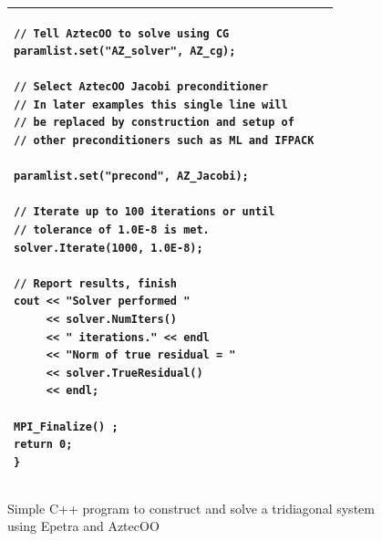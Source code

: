 \documentclass[acmtoms,acmnow]{acmtrans2m}
\begin{document}
\begin{figure}
{\begin{tabular}{|p{2.4in}|p{2.4in}|}
\begin{verbatim}
// Tell AztecOO to solve using CG
paramlist.set("AZ_solver", AZ_cg);
 
// Select AztecOO Jacobi preconditioner
// In later examples this single line will
// be replaced by construction and setup of
// other preconditioners such as ML and IFPACK

paramlist.set("precond", AZ_Jacobi);

// Iterate up to 100 iterations or until
// tolerance of 1.0E-8 is met.
solver.Iterate(1000, 1.0E-8);

// Report results, finish     
cout << "Solver performed " 
     << solver.NumIters()  
     << " iterations." << endl
     << "Norm of true residual = " 
     << solver.TrueResidual() 
     << endl;

MPI_Finalize() ;
return 0;
}
\end{verbatim}
\\\hline
\end{tabular}}
\caption{\label{fig:solvetrid} Simple C++ program to construct and
solve a tridiagonal system using Epetra and AztecOO}
\end{figure}
\end{document}
